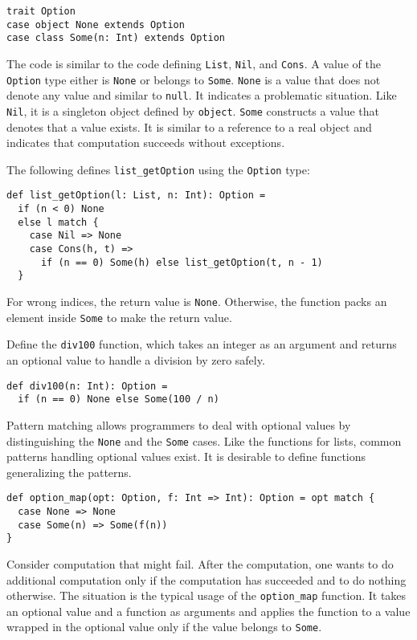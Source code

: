 \begin{verbatim}
trait Option
case object None extends Option
case class Some(n: Int) extends Option
\end{verbatim}

The code is similar to the code defining \verb!List!, \verb!Nil!, and
\verb!Cons!. A value of the \verb!Option! type either is \verb!None! or belongs
to \verb!Some!. \verb!None! is a value that does not denote any value and similar
to \verb!null!. It indicates a problematic situation. Like \verb!Nil!, it is a
singleton object defined by \verb!object!. \verb!Some! constructs a value that
denotes that a value exists. It is similar to a reference to a real object and
indicates that computation succeeds without exceptions.

The following defines \verb!list_getOption! using the \verb!Option! type:

\begin{verbatim}
def list_getOption(l: List, n: Int): Option =
  if (n < 0) None
  else l match {
    case Nil => None
    case Cons(h, t) =>
      if (n == 0) Some(h) else list_getOption(t, n - 1)
  }
\end{verbatim}

For wrong indices, the return value is \verb!None!. Otherwise, the function packs
an element inside \verb!Some! to make the return value.

Define the \verb!div100! function, which takes an integer as an argument and
returns an optional value to handle a division by zero safely.

\begin{verbatim}
def div100(n: Int): Option =
  if (n == 0) None else Some(100 / n)
\end{verbatim}

Pattern matching allows programmers to deal with optional values by
distinguishing the \verb!None! and the \verb!Some! cases. Like the functions for
lists, common patterns handling optional values exist. It is desirable to define
functions generalizing the patterns.

\begin{verbatim}
def option_map(opt: Option, f: Int => Int): Option = opt match {
  case None => None
  case Some(n) => Some(f(n))
}
\end{verbatim}

Consider computation that might fail. After the computation, one wants to do
additional computation only if the computation has succeeded and to do nothing
otherwise. The situation is the typical usage of the \verb!option_map! function.
It takes an optional value and a function as arguments and applies the function
to a value wrapped in the optional value only if the value belongs to
\verb!Some!.

